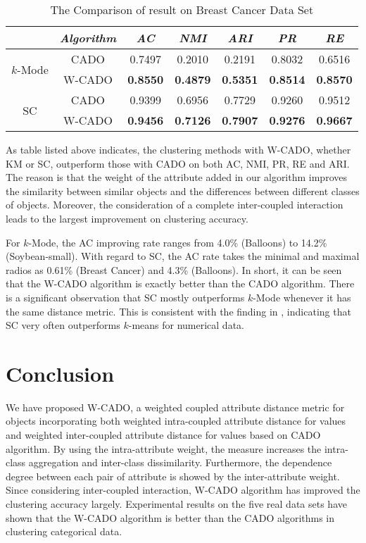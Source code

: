 \documentclass[review]{elsarticle}
\begin{document}
\begin{table}[!h]\tabcolsep=0.065in
\centering
\caption{The Comparison of result on Breast Cancer Data Set}
\small
\label{tab:The Clustering Results Comparison on Breast Cancer Data Set}
\begin{tabular}{ccccccc}
\hline
\emph{}&\emph{Algorithm}&\emph{AC}&\emph{NMI}&\emph{ARI}&\emph{PR}&\emph{RE} \\
\hline
\multirow{2}{*}{$k$-Mode} & CADO & 0.7497 & 0.2010 & 0.2191 & 0.8032 & 0.6516\\
    & W-CADO & \textbf{0.8550} & \textbf{0.4879} & \textbf{0.5351} & \textbf{0.8514} & \textbf{0.8570}\\
    \hline
\multirow{2}{*}{SC} & CADO & 0.9399 & 0.6956 & 0.7729 & 0.9260 & 0.9512\\
    & W-CADO & \textbf{0.9456} & \textbf{0.7126} & \textbf{0.7907} & \textbf{0.9276} & \textbf{0.9667}\\
\hline
\end{tabular}
\end{table}

 As table listed above indicates, the clustering methods with W-CADO, whether KM or SC, outperform those with CADO on both AC, NMI, PR, RE and ARI. The reason is that the weight of the attribute added in our algorithm improves the similarity between similar objects and the differences between different classes of objects. Moreover, the consideration of a complete inter-coupled interaction leads to the largest improvement on clustering accuracy.

 For $k$-Mode, the AC improving rate ranges from 4.0\% (Balloons) to 14.2\% (Soybean-small). With regard to SC, the AC rate takes the minimal and maximal radios as 0.61\% (Breast Cancer) and 4.3\% (Balloons). In short, it can be seen that the W-CADO algorithm is exactly better than the CADO algorithm. There is a significant observation that SC mostly outperforms $k$-Mode whenever it has the same distance metric. This is consistent with the finding in \cite{Luxburg2007A}, indicating that SC very often outperforms $k$-means for numerical data.

\section{Conclusion}
We have proposed W-CADO, a weighted coupled attribute distance metric for objects incorporating both weighted intra-coupled attribute distance for values and weighted inter-coupled attribute distance for values based on CADO algorithm. By using the intra-attribute weight, the measure increases the intra-class aggregation and inter-class dissimilarity. Furthermore, the dependence degree between each pair of attribute is showed by the inter-attribute weight. Since considering inter-coupled interaction, W-CADO algorithm has improved the clustering accuracy largely. Experimental results on the five real data sets have shown that the W-CADO algorithm is better than the CADO algorithms in clustering categorical data.
\end{document}
